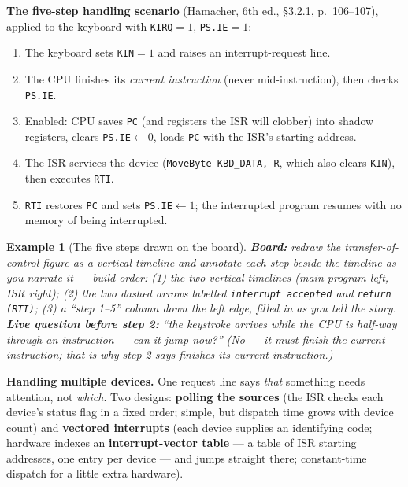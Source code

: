 \documentclass[11pt]{article}
\newtheorem{example}{Example}[section]
\begin{document}
\textbf{The five-step handling scenario} (Hamacher, 6th ed., \S3.2.1, p.~106--107), applied to the keyboard with \texttt{KIRQ}$=1$, \texttt{PS.IE}$=1$:
\begin{enumerate}
  \item The keyboard sets \texttt{KIN}$=1$ and raises an interrupt-request line.
  \item The CPU finishes its \emph{current instruction} (never mid-instruction), then checks \texttt{PS.IE}.
  \item Enabled: CPU saves \texttt{PC} (and registers the ISR will clobber) into shadow registers, clears \texttt{PS.IE}$\gets0$, loads \texttt{PC} with the ISR's starting address.
  \item The ISR services the device (\texttt{MoveByte KBD\_DATA, R}, which also clears \texttt{KIN}), then executes \texttt{RTI}.
  \item \texttt{RTI} restores \texttt{PC} and sets \texttt{PS.IE}$\gets1$; the interrupted program resumes with no memory of being interrupted.
\end{enumerate}

\begin{example}[The five steps drawn on the board]
\label{ex:interruptboard}
\textbf{Board:} redraw the transfer-of-control figure as a vertical timeline and \emph{annotate each step beside the timeline as you narrate it} --- build order: (1) the two vertical timelines (main program left, ISR right); (2) the two dashed arrows labelled \texttt{interrupt accepted} and \texttt{return (RTI)}; (3) a ``step 1--5'' column down the left edge, filled in as you tell the story. \textbf{Live question before step 2:} ``the keystroke arrives while the CPU is half-way through an instruction --- can it jump now?'' (No --- it must finish the current instruction; that is why step 2 says \emph{finishes its current instruction}.)
\end{example}

\textbf{Handling multiple devices.} One request line says \emph{that} something needs attention, not \emph{which}. Two designs: \textbf{polling the sources} (the ISR checks each device's status flag in a fixed order; simple, but dispatch time grows with device count) and \textbf{vectored interrupts} (each device supplies an identifying code; hardware indexes an \textbf{interrupt-vector table} --- a table of ISR starting addresses, one entry per device --- and jumps straight there; constant-time dispatch for a little extra hardware).
\end{document}
